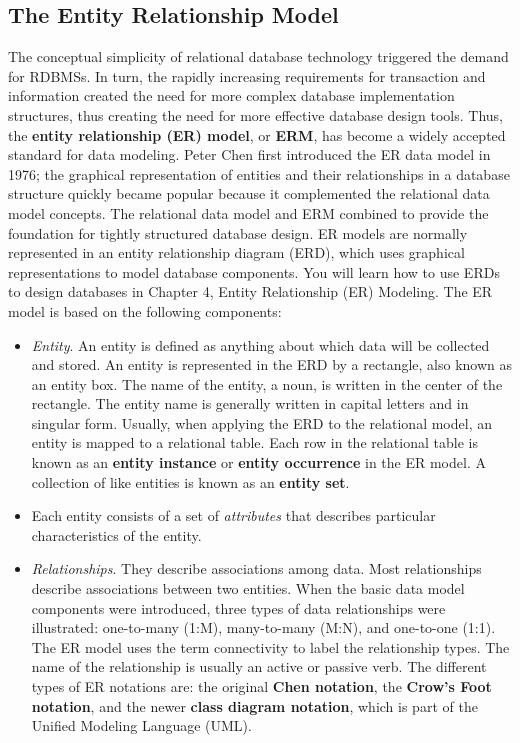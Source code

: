 \documentclass[a4paper, 12pt, titlepage]{report}
\begin{document}
\subsection{The Entity Relationship Model}
The conceptual simplicity of relational database technology triggered the demand for RDBMSs. In turn, the rapidly increasing requirements for transaction and information created the need for more complex database implementation structures, thus creating the need for more effective database design tools. Thus, the \textbf{entity relationship (ER) model}, or \textbf{ERM}, has become a widely accepted standard for data modeling. Peter Chen first introduced the ER data model in 1976; the graphical representation of entities and their relationships in a database structure quickly became popular because it complemented the relational data model concepts. The relational data model
and ERM combined to provide the foundation for tightly structured database design. ER models are normally represented in an entity relationship diagram (ERD), which uses graphical representations to model database components. You will learn how to use ERDs to design databases in Chapter 4, Entity Relationship (ER) Modeling. The ER model is based on the following components:
\begin{itemize}
\item \emph{Entity}. An entity is defined as anything about which data will be collected and stored. An entity is represented in the ERD by a rectangle, also known as an entity box. The name of the entity, a noun, is written in the center of
the rectangle. The entity name is generally written in capital letters and in singular form. Usually, when applying the ERD to the relational model, an entity is mapped to a relational table. Each row in the relational table is known as an \textbf{entity instance} or \textbf{entity occurrence} in the ER model. A collection of like entities is known as an \textbf{entity set}.
\item Each entity consists of a set of \emph{attributes} that describes particular characteristics of the entity.
\item \emph{Relationships}. They describe associations among data. Most relationships describe associations between two entities. When the basic data model components were introduced, three types of data relationships were illustrated: one-to-many (1:M), many-to-many (M:N), and one-to-one (1:1). The ER model uses the term connectivity to label the relationship types. The name of the relationship is usually an active or passive verb. The different types of ER notations are: the original \textbf{Chen notation}, the \textbf{Crow’s Foot notation}, and the newer \textbf{class diagram notation}, which is part of the Unified Modeling Language (UML).
\end{itemize}
\end{document}
